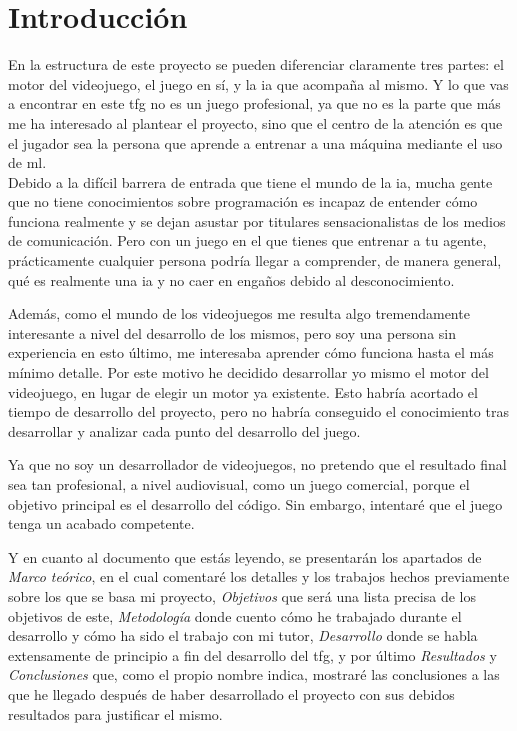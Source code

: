 
\chapter{Introducción}
\label{introduccion}
En la estructura de este proyecto se pueden diferenciar claramente tres partes: el motor del videojuego, el juego en sí, y la \gls{ia} que acompaña al mismo. Y lo que vas a encontrar en este \gls{tfg} no es un juego profesional, ya que no es la parte que más me ha interesado al plantear el proyecto, sino que el centro de la atención es que el jugador sea la persona que aprende a entrenar a una máquina mediante el uso de \gls{ml}.
\\
Debido a la difícil barrera de entrada que tiene el mundo de la \gls{ia}, mucha gente que no tiene conocimientos sobre programación es incapaz de entender cómo funciona realmente y se dejan asustar por titulares sensacionalistas de los medios de comunicación. Pero con un juego en el que tienes que entrenar a tu agente, prácticamente cualquier persona podría llegar a comprender, de manera general, qué es realmente una \gls{ia} y no caer en engaños debido al desconocimiento.

Además, como el mundo de los videojuegos me resulta algo tremendamente interesante a nivel del desarrollo de los mismos, pero soy una persona sin experiencia en esto último, me interesaba aprender cómo funciona hasta el más mínimo detalle. Por este motivo he decidido desarrollar yo mismo el motor del videojuego, en lugar de elegir un motor ya existente. Esto habría acortado el tiempo de desarrollo del proyecto, pero no habría conseguido el conocimiento tras desarrollar y analizar cada punto del desarrollo del juego.

Ya que no soy un desarrollador de videojuegos, no pretendo que el resultado final sea tan profesional, a nivel audiovisual, como un juego comercial, porque el objetivo principal es el desarrollo del código. Sin embargo, intentaré que el juego tenga un acabado competente. 

Y en cuanto al documento que estás leyendo, se presentarán los apartados de \textit{Marco teórico}, en el cual comentaré los detalles y los trabajos hechos previamente sobre los que se basa mi proyecto, \textit{Objetivos} que será una lista precisa de los objetivos de este, \textit{Metodología} donde cuento cómo he trabajado durante el desarrollo y cómo ha sido el trabajo con mi tutor, \textit{Desarrollo} donde se habla extensamente de principio a fin del desarrollo del \gls{tfg}, y por último \textit{Resultados} y \textit{Conclusiones} que, como el propio nombre indica, mostraré las conclusiones a las que he llegado después de haber desarrollado el proyecto con sus debidos resultados para justificar el mismo.

